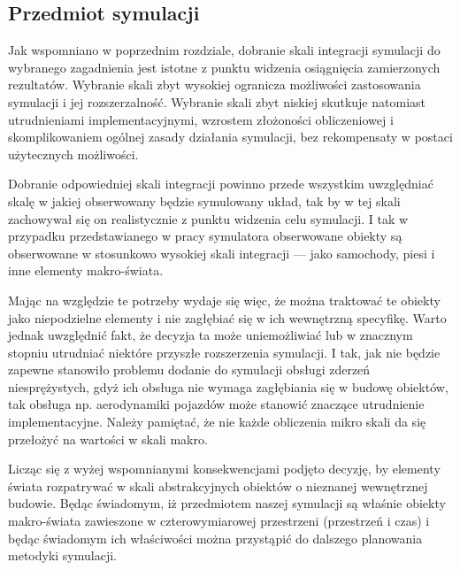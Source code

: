 \subsection{Przedmiot symulacji}
\par{
Jak wspomniano w poprzednim rozdziale, dobranie skali integracji symulacji do wybranego zagadnienia jest istotne z punktu widzenia osiągnięcia zamierzonych rezultatów. Wybranie skali zbyt wysokiej ogranicza możliwości zastosowania symulacji i jej rozszerzalność. Wybranie skali zbyt niskiej skutkuje natomiast utrudnieniami implementacyjnymi, wzrostem złożoności obliczeniowej i skomplikowaniem ogólnej zasady działania symulacji, bez rekompensaty w postaci użytecznych możliwości.
}
\par{
Dobranie odpowiedniej skali integracji powinno przede wszystkim uwzględniać skalę w jakiej obserwowany będzie symulowany układ, tak by w tej skali zachowywał się on realistycznie z punktu widzenia celu symulacji. I tak w przypadku przedstawianego w pracy symulatora obserwowane obiekty są obserwowane w stosunkowo wysokiej skali integracji --- jako samochody, piesi i inne elementy makro-świata.
}
\par{
Mając na względzie te potrzeby wydaje się więc, że można traktować te obiekty jako niepodzielne elementy i nie zagłębiać się w ich wewnętrzną specyfikę. Warto jednak uwzględnić fakt, że decyzja ta może uniemożliwiać lub w znacznym stopniu utrudniać niektóre przyszłe rozszerzenia symulacji. I tak, jak nie będzie zapewne stanowiło problemu dodanie do symulacji obsługi zderzeń niesprężystych, gdyż ich obsługa nie wymaga zagłębiania się w budowę obiektów, tak obsługa np. aerodynamiki pojazdów może stanowić znaczące utrudnienie implementacyjne. Należy pamiętać, że nie każde obliczenia mikro skali da się przełożyć na wartości w skali makro.
}
\par{
Licząc się z wyżej wspomnianymi konsekwencjami podjęto decyzję, by elementy świata rozpatrywać w skali abstrakcyjnych obiektów o nieznanej wewnętrznej budowie. Będąc świadomym, iż przedmiotem naszej symulacji są właśnie obiekty makro-świata zawieszone w czterowymiarowej przestrzeni (przestrzeń i czas) i będąc świadomym ich właściwości można przystąpić do dalszego planowania metodyki symulacji.
}

